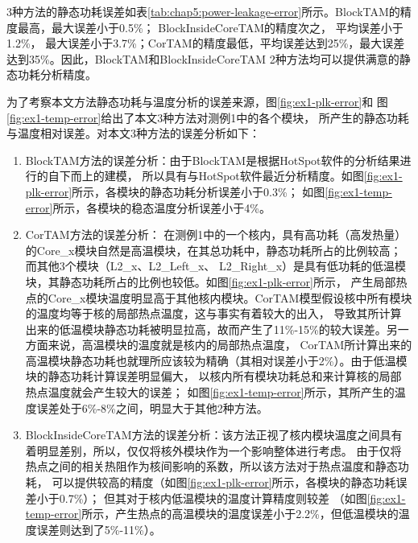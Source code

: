 3种方法的静态功耗误差如表\ref{tab:chap5:power-leakage-error}所示。BlockTAM的精度最高，最大误差小于0.5\%； BlockInsideCoreTAM的精度次之， 平均误差小于1.2\%， 最大误差小于3.7\%；CorTAM的精度最低，平均误差达到25\%，最大误差达到35\%。因此，BlockTAM和BlockInsideCoreTAM 2种方法均可以提供满意的静态功耗分析精度。

为了考察本文方法静态功耗与温度分析的误差来源，图\ref{fig:ex1-plk-error}和 图\ref{fig:ex1-temp-error}给出了本文3种方法对测例1中的各个模块， 所产生的静态功耗与温度相对误差。对本文3种方法的误差分析如下：
\begin{enumerate}[1)]
\item BlockTAM方法的误差分析：由于BlockTAM是根据HotSpot软件的分析结果进行的自下而上的建模， 所以具有与HotSpot软件最近分析精度。如图\ref{fig:ex1-plk-error}所示，各模块的静态功耗分析误差小于0.3\%； 如图\ref{fig:ex1-temp-error}所示，各模块的稳态温度分析误差小于4\%。
\item CorTAM方法的误差分析： 在测例1中的一个核内，具有高功耗（高发热量）的Core\_x模块自然是高温模块，在其总功耗中，静态功耗所占的比例较高； 而其他3个模块（L2\_x、L2\_Left\_x、 L2\_Right\_x）是具有低功耗的低温模块，其静态功耗所占的比例也较低。如图\ref{fig:ex1-plk-error}所示， 产生局部热点的Core\_x模块温度明显高于其他核内模块。CorTAM模型假设核中所有模块的温度均等于核的局部热点温度，这与事实有着较大的出入， 导致其所计算出来的低温模块静态功耗被明显拉高，故而产生了11\%-15\%的较大误差。另一方面来说，高温模块的温度就是核内的局部热点温度， CorTAM所计算出来的高温模块静态功耗也就理所应该较为精确（其相对误差小于2\%）。由于低温模块的静态功耗计算误差明显偏大， 以核内所有模块功耗总和来计算核的局部热点温度就会产生较大的误差； 如图\ref{fig:ex1-temp-error}所示，其所产生的温度误差处于6\%-8\%之间，明显大于其他2种方法。

\item BlockInsideCoreTAM方法的误差分析：该方法正视了核内模块温度之间具有着明显差别，所以，仅仅将核外模块作为一个影响整体进行考虑。 由于仅将热点之间的相关热阻作为核间影响的系数，所以该方法对于热点温度和静态功耗， 可以提供较高的精度（如图\ref{fig:ex1-plk-error}所示，各模块的静态功耗误差小于0.7\%）； 但其对于核内低温模块的温度计算精度则较差 （如图\ref{fig:ex1-temp-error}所示，产生热点的高温模块的温度误差小于2.2\%，但低温模块的温度误差则达到了5\%-11\%）。
\end{enumerate}

